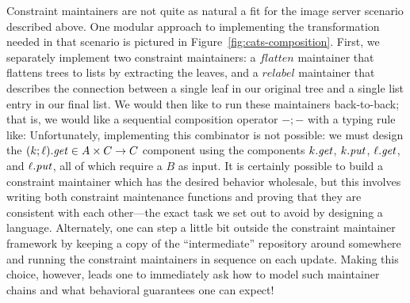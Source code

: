Constraint maintainers are not quite as natural a fit for the image server
scenario described above. One modular approach to implementing the
transformation needed in that scenario is pictured in
Figure~\ref{fig:cats-composition}. First, we separately implement two
constraint maintainers: a $\mathit{flatten}$ maintainer that flattens trees
to lists by extracting the leaves, and a $\mathit{relabel}$ maintainer that
describes the connection between a single leaf in our original tree and a
single list entry in our final list. We would then like to run these
maintainers back-to-back; that is, we would like a sequential composition
operator $-;-$ with a typing rule like:
Unfortunately, implementing this combinator is not possible: we must design
the $(k;\ell).\mathit{get} \in A \times C \to C$ component using the
components $k.\mathit{get}$, $k.\mathit{put}$, $\ell.\mathit{get}$, and $\ell.\mathit{put}$, all of
which require a $B$ as input. It is certainly possible to build a constraint
maintainer which has the desired behavior wholesale, but this involves
writing both constraint maintenance functions and proving that they are
consistent with each other---the exact task we set out to avoid by
designing a language. Alternately, one can step a little bit outside the
constraint maintainer framework by keeping a copy of the ``intermediate''
repository around somewhere and running the constraint maintainers in
sequence on each update. Making this choice, however, leads one to
immediately ask how to model such maintainer chains and what behavioral
guarantees one can expect!

